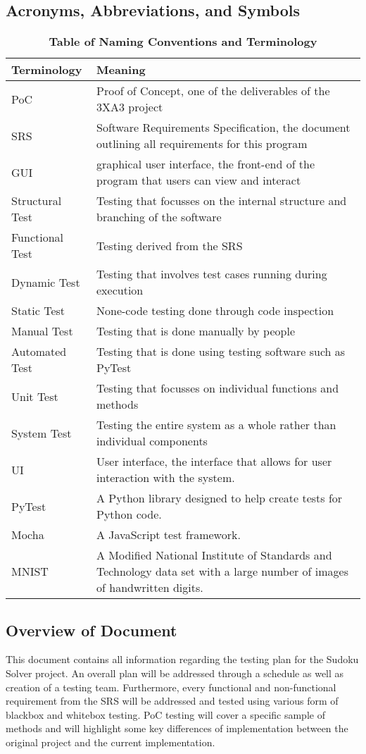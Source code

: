 \documentclass[11pt]{article}
\begin{document}
\subsection{Acronyms, Abbreviations, and Symbols}
\begin{table}[H]
\caption{\bf Table of Naming Conventions and Terminology} \label{Table}
\centering
\begin{tabularx}{\textwidth}{p{3cm}X}
\toprule
Terminology     & Meaning \\
\midrule
PoC & Proof of Concept, one of the deliverables of the 3XA3 project\\
SRS & Software Requirements Specification, the document outlining all requirements for this program\\
GUI & graphical user interface, the front-end of the program that users can view and interact\\
Structural Test & Testing that focusses on the internal structure and branching of the software\\
Functional Test & Testing derived from the SRS\\
Dynamic Test & Testing that involves test cases running during execution\\
Static Test & None-code testing done through code inspection\\
Manual Test & Testing that is done manually by people\\
Automated Test & Testing that is done using testing software such as PyTest\\
Unit Test & Testing that focusses on individual functions and methods\\
System Test & Testing the entire system as a whole rather than individual components\\
UI     & User interface, the interface that allows for user interaction with the system. \\
PyTest & A Python library designed to help create tests for Python code. \\
Mocha & A JavaScript test framework. \\
MNIST & A Modified National Institute of Standards and Technology data set with a large number of images of handwritten digits.\\
\bottomrule
\end{tabularx}
\end{table}

\subsection{Overview of Document}
This document contains all information regarding the testing plan for the Sudoku Solver project. An overall plan will be addressed through a schedule as well as creation of a testing team. Furthermore, every functional and non-functional requirement from the SRS will be addressed and tested using various form of blackbox and whitebox testing. PoC testing will cover a specific sample of methods and will highlight some key differences of implementation between the original project and the current implementation.
\end{document}
